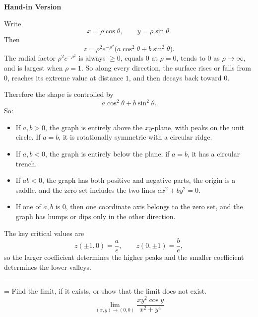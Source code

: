 \documentclass[a4paper,12pt,twocolumn]{article}
\newlength{\problemnumberwidth}
\newenvironment{solutionbox}{\begin{framed}}{\end{framed}}
\newcommand{\sectiontitle}[2]{%
  \hypertarget{#1}{}%
  \par\vspace{0.8em}%
  \noindent{\Large\bfseries #2}\par
  \vspace{0.3em}%
  \hrule
  \vspace{0.8em}%
}
\newcommand{\problem}[3]{%
  \Needspace{10\baselineskip}%
  \phantomsection\label{#1}%
  \par\vspace{0.8em}%
  \noindent
  \hangindent=\problemnumberwidth
  \hangafter=1
  \makebox[\problemnumberwidth][l]{\textbf{#2.}}#3\par
}
\begin{document}
\begin{solutionbox}
\textbf{Hand-in Version}

Write
\[
x=\rho\cos\theta,\qquad y=\rho\sin\theta.
\]
Then
\[
z=\rho^2e^{-\rho^2}\bigl(a\cos^2\theta+b\sin^2\theta\bigr).
\]
The radial factor \(\rho^2e^{-\rho^2}\) is always \(\ge 0\), equals \(0\) at \(\rho=0\), tends to \(0\) as \(\rho\to\infty\), and is largest when \(\rho=1\). So along every direction, the surface rises or falls from \(0\), reaches its extreme value at distance \(1\), and then decays back toward \(0\).

Therefore the shape is controlled by
\[
a\cos^2\theta+b\sin^2\theta.
\]
So:
\begin{itemize}
\item If \(a,b>0\), the graph is entirely above the \(xy\)-plane, with peaks on the unit circle. If \(a=b\), it is rotationally symmetric with a circular ridge.
\item If \(a,b<0\), the graph is entirely below the plane; if \(a=b\), it has a circular trench.
\item If \(ab<0\), the graph has both positive and negative parts, the origin is a saddle, and the zero set includes the two lines \(ax^2+by^2=0\).
\item If one of \(a,b\) is \(0\), then one coordinate axis belongs to the zero set, and the graph has humps or dips only in the other direction.
\end{itemize}

The key critical values are
\[
z(\pm1,0)=\frac{a}{e},\qquad z(0,\pm1)=\frac{b}{e},
\]
so the larger coefficient determines the higher peaks and the smaller coefficient determines the lower valleys.
\end{solutionbox}

\sectiontitle{sec:14-2}{14-2}

\problem{prob:14-2-23}{23}{Find the limit, if it exists, or show that the limit does not exist.
\[
\lim_{(x,y)\to(0,0)} \frac{xy^2\cos y}{x^2+y^4}
\]}
\end{document}

